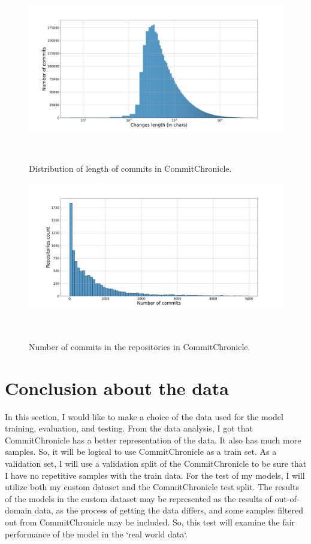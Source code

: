 \begin{figure}[H]
    \includegraphics[scale=0.30]{figs/changes_len_dist_comchron.png}
    \caption{Distribution of length of commits in CommitChronicle.}~\label{fig:changes_len_dist_CommitChronicle}
\end{figure}

\begin{figure}[H]
    \includegraphics[scale=0.30]{figs/Commits distribution_comchron.png}
    \caption{Number of commits in the repositories in CommitChronicle.}~\label{fig:commits_distribution_CommitChronicle}
\end{figure}

\section{Conclusion about the data}
In this section, I would like to make a choice of the data used for the model training, evaluation, and testing. From the data analysis, I got that CommitChronicle has a better representation of the data. It also has much more samples. So, it will be logical to use CommitChronicle as a train set. As a validation set, I will use a validation split of the CommitChronicle to be sure that I have no repetitive samples with the train data. For the test of my models, I will utilize both my custom dataset and the CommitChronicle test split. The results of the models in the custom dataset may be represented as the results of out-of-domain data, as the process of getting the data differs, and some samples filtered out from CommitChronicle may be included.  So, this test will examine the fair performance of the model in the `real world data`.


